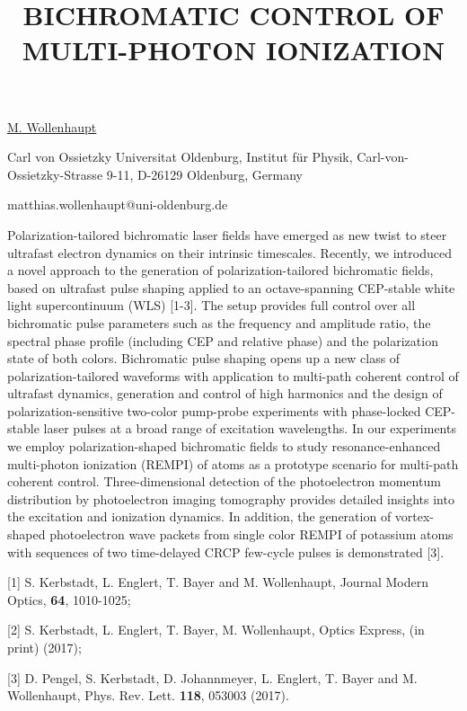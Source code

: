 \title{BICHROMATIC CONTROL OF MULTI-PHOTON IONIZATION}

\underline{M. Wollenhaupt} 

{\normalsize{\vspace{-4mm}
Carl von Ossietzky Universitat Oldenburg,
Institut für Physik,
Carl-von-Ossietzky-Strasse 9-11,
D-26129 Oldenburg,
Germany

\email matthias.wollenhaupt@uni-oldenburg.de}}

Polarization-tailored bichromatic laser fields have emerged as new twist to steer ultrafast electron dynamics on their intrinsic timescales. Recently, we introduced a novel approach to the generation of polarization-tailored bichromatic fields, based on ultrafast pulse shaping applied to an octave-spanning CEP-stable white light supercontinuum (WLS) [1-3]. The setup provides full control over all bichromatic pulse parameters such as the frequency and amplitude ratio, the spectral phase profile (including CEP and relative phase) and the polarization state of both colors. Bichromatic pulse shaping opens up a new class of polarization-tailored waveforms with application to multi-path coherent control of ultrafast dynamics, generation and control of high harmonics and the design of polarization-sensitive two-color pump-probe experiments with phase-locked CEP-stable laser pulses at a broad range of excitation wavelengths.
In our experiments we employ polarization-shaped bichromatic fields to study resonance-enhanced multi-photon ionization (REMPI) of atoms as a prototype scenario for multi-path coherent control. Three-dimensional detection of the photoelectron momentum distribution by photoelectron imaging tomography provides detailed insights into the excitation and ionization dynamics. In addition, the generation of vortex-shaped photoelectron wave packets from single color REMPI of potassium atoms with sequences of two time-delayed CRCP few-cycle pulses is demonstrated [3].

{\normalsize
[1] S. Kerbstadt, L. Englert, T. Bayer and M. Wollenhaupt, Journal Modern Optics, \textbf{64}, 1010-1025;
\vsp

[2] S. Kerbstadt, L. Englert, T. Bayer, M. Wollenhaupt, Optics Express, (in print) (2017);
\vsp

[3] D. Pengel, S. Kerbstadt, D. Johannmeyer, L. Englert, T. Bayer and M. Wollenhaupt, Phys. Rev. Lett. \textbf{118}, 053003 (2017).
}

\vspace{\baselineskip} 